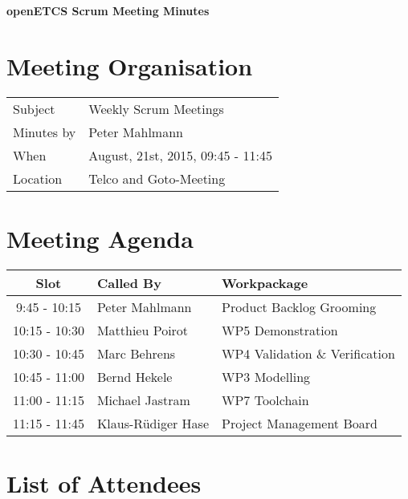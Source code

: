 \documentclass[a4paper, 11pt]{article}
\begin{document}
{\begin{center}\huge\bf openETCS Scrum Meeting Minutes\end{center}}
\section{Meeting Organisation}

\renewcommand{\arraystretch}{1.5}
\begin{supertabular}{m{.2\textwidth}m{.8\textwidth}}
Subject & Weekly Scrum Meetings\\
Minutes by & Peter Mahlmann\\
When & August, 21st, 2015, 09:45 - 11:45\\
Location & Telco and Goto-Meeting\\
\end{supertabular}

\renewcommand{\arraystretch}{1.0}
\section{Meeting Agenda}

\begin{tabular}{cll}
\toprule
\textbf{Slot} &  \textbf{Called By} & \textbf{Workpackage} \\
\midrule 
9:45 - 10:15 & Peter Mahlmann & Product Backlog Grooming  \\
10:15 - 10:30 & Matthieu Poirot & WP5 Demonstration \\  
10:30 - 10:45 & Marc Behrens & WP4 Validation \& Verification \\
10:45 - 11:00 & Bernd Hekele & WP3 Modelling \\
11:00 - 11:15 & Michael Jastram  & WP7 Toolchain \\
11:15 - 11:45 & Klaus-R\"udiger Hase & Project Management Board \\
\bottomrule
\end{tabular}

\section{List of Attendees}
\end{document}
